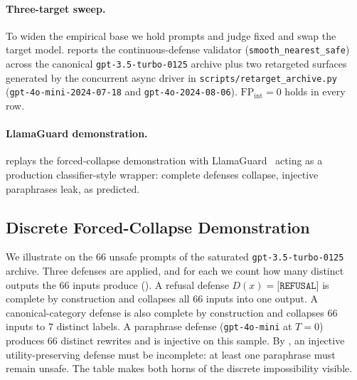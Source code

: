 \documentclass[11pt]{article}
\begin{document}
\paragraph{Three-target sweep.}
To widen the empirical base we hold prompts and judge fixed and swap
the target model.  reports the
continuous-defense validator (\texttt{smooth\_nearest\_safe}) across
the canonical \texttt{gpt-3.5-turbo-0125} archive plus two retargeted
surfaces generated by the concurrent async driver in
\texttt{scripts/retarget\_archive.py} (\texttt{gpt-4o-mini-2024-07-18}
and \texttt{gpt-4o-2024-08-06}). $\mathrm{FP}_{\mathrm{int}} = 0$
holds in every row.

\begin{table}[h]
\centering
\small
\caption{Continuous-defense validator across three OpenAI target
models. All rows share the 82 prompts from the saturated archive and
the canonical gpt-4.1 judge; only the target varies.
$\mathrm{FP}_{\mathrm{int}} = 0$ holds across all three.}
\label{tab:three-target}

\end{table}

\paragraph{LlamaGuard demonstration.}
 replays the forced-collapse demonstration
with LlamaGuard~\cite{inan2023llama} acting as a production
classifier-style wrapper: complete defenses collapse, injective
paraphrases leak, as predicted.

\begin{table}[h]
\centering
\small
\caption{Llama-Guard-3-1B (via local Ollama) applied to the $82$
unsafe-seed prompts of the saturated archive, demonstrating
's injective-incomplete horn on a production
safety classifier. 52 of 82 attacks are waved through as \texttt{safe}
(false negatives), while the 30 flagged cases are distributed across
6 of 14 LlamaGuard categories.}
\label{tab:llamaguard-demo}

\end{table}

\subsection{Discrete Forced-Collapse Demonstration}

We illustrate  on the $66$ unsafe prompts of the
saturated \texttt{gpt-3.5-turbo-0125} archive. Three defenses are
applied, and for each we count how many distinct outputs the $66$
inputs produce (). A refusal defense
$D(x) = \texttt{[REFUSAL]}$ is complete by construction and collapses
all $66$ inputs into one output. A canonical-category defense is also
complete by construction and collapses $66$ inputs to $7$ distinct
labels. A paraphrase defense (\texttt{gpt-4o-mini} at $T=0$) produces
$66$ distinct rewrites and is injective on this sample. By
, an injective utility-preserving defense must
be incomplete: at least one paraphrase must remain unsafe. The table
makes both horns of the discrete impossibility visible.
\end{document}
